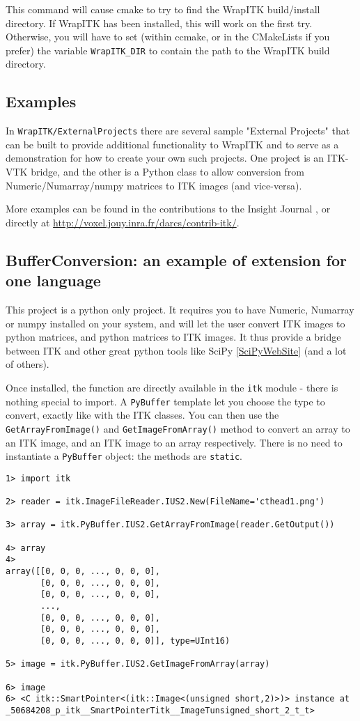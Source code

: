 \documentclass{InsightArticle}
\begin{document}
This command will cause cmake to try to find the WrapITK build/install
directory. If WrapITK has been installed, this will work on the first try.
Otherwise, you will have to set (within ccmake, or in the CMakeLists if you
prefer) the variable \verb$WrapITK_DIR$ to contain the path to the WrapITK build
directory.

    \subsection{Examples}

In \verb$WrapITK/ExternalProjects$ there are several sample "External Projects" that
can be built to provide additional functionality to WrapITK and to serve as a
demonstration for how to create your own such projects. One project is an
ITK-VTK \cite{VtkWebSite} bridge, and the other is a Python class to allow conversion from
Numeric/Numarray/numpy \cite{NumericWebSite,NumarrayWebSite,NumpyWebSite} matrices to
ITK images (and vice-versa).

More examples can be found in the contributions to the Insight Journal
\cite{InsightJournalWebSite}, or directly at \url{http://voxel.jouy.inra.fr/darcs/contrib-itk/}.

    \subsection{BufferConversion: an example of extension for one language}

This project is a python only project. It requires you to have Numeric, Numarray or numpy installed
on your system, and will let the user convert ITK images to python matrices, and python matrices
to ITK images. It thus provide a bridge between ITK and other great python tools like SciPy
\ref{SciPyWebSite} (and a lot of others).

Once installed, the function are directly available in the \verb$itk$ module - there is nothing
special to import. A \verb$PyBuffer$ template let you choose the type to convert, exactly
like with the ITK classes. You can then use the \verb$GetArrayFromImage()$ and
\verb$GetImageFromArray()$ method to convert an array to an ITK image, and an
ITK image to an array respectively. There is no need to instantiate a \verb$PyBuffer$ object: the methods
are \verb$static$.

\begin{verbatim}
1> import itk

2> reader = itk.ImageFileReader.IUS2.New(FileName='cthead1.png')

3> array = itk.PyBuffer.IUS2.GetArrayFromImage(reader.GetOutput())

4> array
4>
array([[0, 0, 0, ..., 0, 0, 0],
       [0, 0, 0, ..., 0, 0, 0],
       [0, 0, 0, ..., 0, 0, 0],
       ...,
       [0, 0, 0, ..., 0, 0, 0],
       [0, 0, 0, ..., 0, 0, 0],
       [0, 0, 0, ..., 0, 0, 0]], type=UInt16)

5> image = itk.PyBuffer.IUS2.GetImageFromArray(array)

6> image
6> <C itk::SmartPointer<(itk::Image<(unsigned short,2)>)> instance at _50684208_p_itk__SmartPointerTitk__ImageTunsigned_short_2_t_t>
\end{verbatim}
\end{document}
